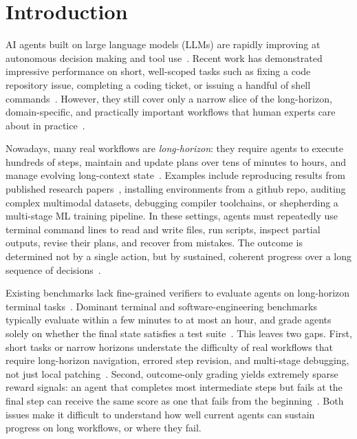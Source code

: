 \section{Introduction}

AI agents built on large language models (LLMs) are rapidly improving at autonomous decision making and tool use~\cite{du2026survey, chowa2026language}.
%
Recent work has demonstrated impressive performance on short, well-scoped tasks such as fixing a code repository issue, completing a coding ticket, or issuing a handful of shell commands~\cite{merrill2026terminalbenchbenchmarkingagentshard}.
%
However, they still cover only a narrow slice of the long-horizon, domain-specific, and practically important workflows that human experts care about in practice~\citep{zhou2023webarena,xie2024osworld,merrill2026terminalbenchbenchmarkingagentshard}.

Nowadays, many real workflows are \emph{long-horizon}: they require agents to execute hundreds of steps, maintain and update plans over tens of minutes to hours, and manage evolving long-context state~\cite{wang2026long}.
%
Examples include reproducing results from published research papers~\cite{song2026drclaw}, installing environments from a github repo, auditing complex multimodal datasets, debugging compiler toolchains, or shepherding a multi-stage ML training pipeline.
%
In these settings, agents must repeatedly use terminal command lines to read and write files, run scripts, inspect partial outputs, revise their plans, and recover from mistakes.
%
The outcome is determined not by a single action, but by sustained, coherent progress over a long sequence of decisions~\cite{liu2026klong}.

Existing benchmarks lack fine-grained verifiers to evaluate agents on long-horizon terminal tasks~\cite{jimenez2024swebench}.
%
Dominant terminal and software-engineering benchmarks typically evaluate within a few minutes to at most an hour, and grade agents solely on whether the final state satisfies a test suite~\cite{desai2026swemarathon,frontierswe2026}.
%
This leaves two gaps.
%
First, short tasks or narrow horizons understate the difficulty of real workflows that require long-horizon navigation, errored step revision, and multi-stage debugging, not just local patching~\cite{merrill2026terminalbenchbenchmarkingagentshard, feng2026longcli}.
%
Second, outcome-only grading yields extremely sparse reward signals: an agent that completes most intermediate steps but fails at the final step can receive the same score as one that fails from the beginning~\cite{lin2025cuarewardbench}.
%
Both issues make it difficult to understand how well current agents can sustain progress on long workflows, or where they fail.

